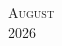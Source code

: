 \documentclass[
	a4paper, %
	10pt, %
]{CSCalendars}
\begin{document}




\begin{center}
	\textsc{\LARGE August}\\ %
	\textsc{\large 2026} %
\end{center}
\end{document}
